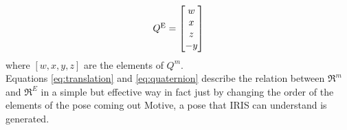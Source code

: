\begin{equation}
Q\textsuperscript{E} = \begin{bmatrix}
w\\x\\z\\-y
\end{bmatrix}
\label{eq:quaternion}
\end{equation}
where $[w, x, y, z]$ are the elements of $Q^m$.\\

\noindent
Equations \ref{eq:translation} and \ref{eq:quaternion} describe the relation between $\Re^m$ and  $\Re^E$ in a simple but effective way in fact just by changing the order of the elements of the pose coming out Motive, a pose that IRIS can understand is generated. 
